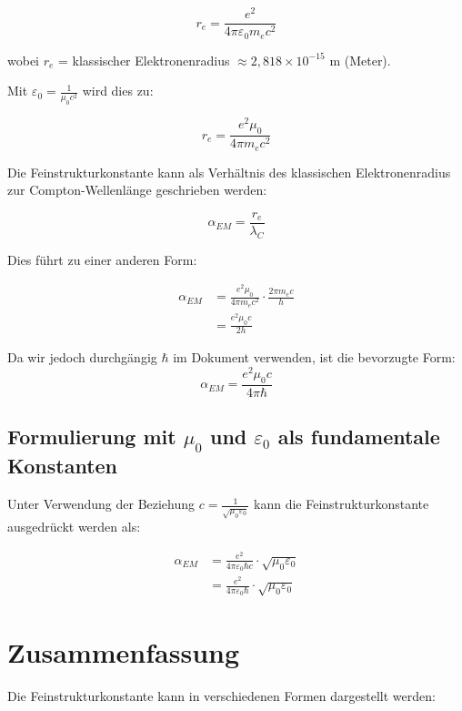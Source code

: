 \documentclass[12pt,a4paper]{article}
\begin{document}
	\begin{equation}
		r_e = \frac{e^2}{4\pi\varepsilon_0 m_e c^2}
	\end{equation}
	
	wobei $r_e$ = klassischer Elektronenradius $\approx 2,818 \times 10^{-15}$ m (Meter).
	
	Mit $\varepsilon_0 = \frac{1}{\mu_0c^2}$ wird dies zu:
	
	\begin{equation}
		r_e = \frac{e^2\mu_0}{4\pi m_e c^2}
	\end{equation}
	
	Die Feinstrukturkonstante kann als Verhältnis des klassischen Elektronenradius zur Compton-Wellenlänge geschrieben werden:
	
	\begin{equation}
		\alpha_{EM} = \frac{r_e}{\lambda_C}
	\end{equation}
	
	Dies führt zu einer anderen Form:
	
	\begin{align}
		\alpha_{EM} &= \frac{e^2\mu_0}{4\pi m_e c^2} \cdot \frac{2\pi m_e c}{h}\\
		&= \frac{e^2\mu_0 c}{2h}
	\end{align}
	
	Da wir jedoch durchgängig $\hbar$ im Dokument verwenden, ist die bevorzugte Form:
	\begin{equation}
		\alpha_{EM} = \frac{e^2\mu_0 c}{4\pi\hbar}
	\end{equation}
	
	\subsection{Formulierung mit $\mu_0$ und $\varepsilon_0$ als fundamentale Konstanten}
	Unter Verwendung der Beziehung $c = \frac{1}{\sqrt{\mu_0\varepsilon_0}}$ kann die Feinstrukturkonstante ausgedrückt werden als:
	
	\begin{align}
		\alpha_{EM} &= \frac{e^2}{4\pi\varepsilon_0\hbar c} \cdot \sqrt{\mu_0\varepsilon_0}\\
		&= \frac{e^2}{4\pi\varepsilon_0\hbar} \cdot \sqrt{\mu_0\varepsilon_0}
	\end{align}
	
	\section{Zusammenfassung}
	Die Feinstrukturkonstante kann in verschiedenen Formen dargestellt werden:
	
\end{document}

